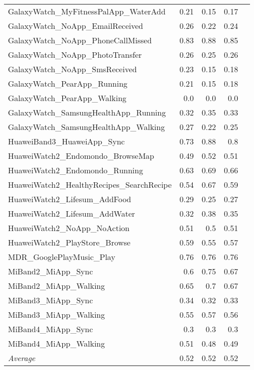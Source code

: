 \begin{tabular}{lrrrr}
    GalaxyWatch_MyFitnessPalApp_WaterAdd & 0.21 & 0.15 & 0.17 \\
    GalaxyWatch_NoApp_EmailReceived & 0.26 & 0.22 & 0.24 \\
    GalaxyWatch_NoApp_PhoneCallMissed & 0.83 & 0.88 & 0.85 \\
    GalaxyWatch_NoApp_PhotoTransfer & 0.26 & 0.25 & 0.26 \\
    GalaxyWatch_NoApp_SmsReceived & 0.23 & 0.15 & 0.18 \\
    GalaxyWatch_PearApp_Running & 0.21 & 0.15 & 0.18 \\
    GalaxyWatch_PearApp_Walking & 0.0 & 0.0 & 0.0 \\
    GalaxyWatch_SamsungHealthApp_Running & 0.32 & 0.35 & 0.33 \\
    GalaxyWatch_SamsungHealthApp_Walking & 0.27 & 0.22 & 0.25 \\
    HuaweiBand3_HuaweiApp_Sync & 0.73 & 0.88 & 0.8 \\
    HuaweiWatch2_Endomondo_BrowseMap & 0.49 & 0.52 & 0.51 \\
    HuaweiWatch2_Endomondo_Running & 0.63 & 0.69 & 0.66 \\
    HuaweiWatch2_HealthyRecipes_SearchRecipe & 0.54 & 0.67 & 0.59 \\
    HuaweiWatch2_Lifesum_AddFood & 0.29 & 0.25 & 0.27 \\
    HuaweiWatch2_Lifesum_AddWater & 0.32 & 0.38 & 0.35 \\
    HuaweiWatch2_NoApp_NoAction & 0.51 & 0.5 & 0.51 \\
    HuaweiWatch2_PlayStore_Browse & 0.59 & 0.55 & 0.57 \\
    MDR_GooglePlayMusic_Play & 0.76 & 0.76 & 0.76 \\
    MiBand2_MiApp_Sync & 0.6 & 0.75 & 0.67 \\
    MiBand2_MiApp_Walking & 0.65 & 0.7 & 0.67 \\
    MiBand3_MiApp_Sync & 0.34 & 0.32 & 0.33 \\
    MiBand3_MiApp_Walking & 0.55 & 0.57 & 0.56 \\
    MiBand4_MiApp_Sync & 0.3 & 0.3 & 0.3 \\
    MiBand4_MiApp_Walking & 0.51 & 0.48 & 0.49 \\
    \emph{Average} & 0.52 & 0.52 & 0.52 \\
\end{tabular}